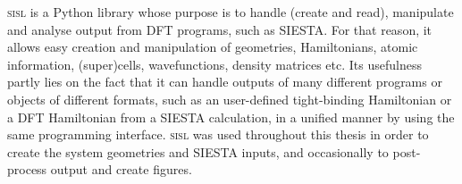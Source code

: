 \textsc{sisl}\parencite{Papior2020} is a Python library whose purpose is to handle (create and read), manipulate and analyse output from DFT programs, such as SIESTA. For that reason, it allows easy creation and manipulation of geometries, Hamiltonians, atomic information, (super)cells, wavefunctions, density matrices etc. Its usefulness partly lies on the fact that it can handle outputs of many different programs or objects of different formats, such as an user-defined tight-binding Hamiltonian or a DFT Hamiltonian from a SIESTA calculation, in a unified manner by using the same programming interface. \textsc{sisl} was used throughout this thesis in order to create the system geometries and SIESTA inputs, and occasionally to post-process output and create figures.




